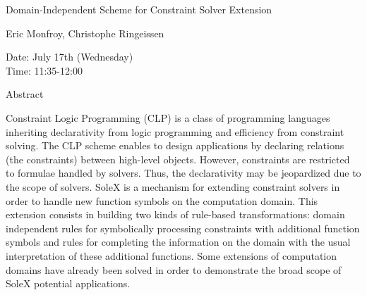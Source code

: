 \begin{center}
\LARGE
Domain-Independent Scheme for Constraint Solver
                           Extension
\end{center}

\begin{center}
\Large
Eric Monfroy, Christophe Ringeissen

\end{center}

\noindent
Date:  July 17th (Wednesday)\\
Time:  11:35-12:00\\

\begin{center}
\large
Abstract
\end{center}

Constraint Logic Programming (CLP) is a class of programming languages inheriting declarativity
from logic programming and efficiency from constraint solving. The CLP scheme enables to
design applications by declaring relations (the constraints) between high-level objects. However,
constraints are restricted to formulae handled by solvers. Thus, the declarativity may be
jeopardized due to the scope of solvers. 
SoleX is a mechanism for extending constraint solvers in order to handle new function symbols on
the computation domain. This extension consists in building two kinds of rule-based
transformations: domain independent rules for symbolically processing constraints with additional
function symbols and rules for completing the information on the domain with the usual
interpretation of these additional functions. Some extensions of computation domains have already
been solved in order to demonstrate the broad scope of SoleX potential applications. 

